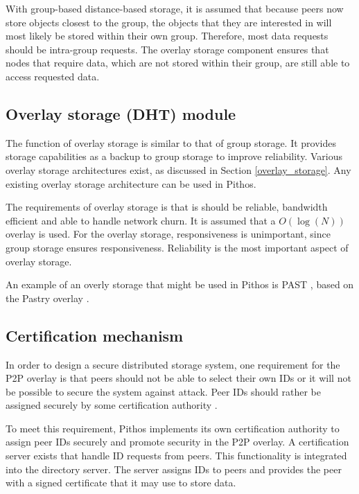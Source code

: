 With group-based distance-based storage, it is assumed that because peers now store objects closest to the group, the objects that they are interested in will most likely be stored within their own group. Therefore, most data requests should be intra-group requests. The overlay storage component ensures that nodes that require data, which are not stored within their group, are still able to access requested data.

\subsection{Overlay storage (DHT) module}

The function of overlay storage is similar to that of group storage. It provides storage capabilities as a backup to group storage to improve reliability. Various overlay storage architectures exist, as discussed in Section \ref{overlay_storage}. Any existing overlay storage architecture can be used in Pithos.

The requirements of overlay storage is that is should be reliable, bandwidth efficient and able to handle network churn. It is assumed that a $O(\log(N))$ overlay is used. For the overlay storage, responsiveness is unimportant, since group storage ensures responsiveness. Reliability is the most important aspect of overlay storage.

An example of an overly storage that might be used in Pithos is PAST \cite{PAST_storage}, based on the Pastry overlay \cite{pastry}.

\subsection{Certification mechanism}

In order to design a secure distributed storage system, one requirement for the P2P overlay is that peers should not be able to select their own IDs or it will not be possible to secure the system against attack. Peer IDs should rather be assigned securely by some certification authority \cite{secure_overlay_routing}.

To meet this requirement, Pithos implements its own certification authority to assign peer IDs securely and promote security in the P2P overlay. A certification server exists that handle ID requests from peers. This functionality is integrated into the directory server. The server assigns IDs to peers and provides the peer with a signed certificate that it may use to store data.

